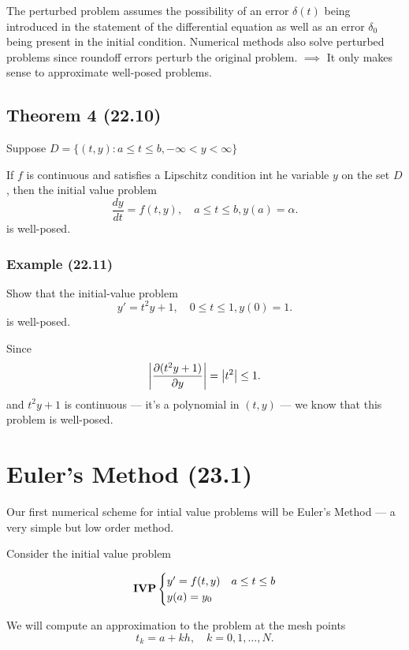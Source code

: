 The perturbed problem assumes the possibility of an error $\delta(t)$ being
introduced in the statement of the differential equation as well as an error
$\delta_0$ being present in the initial condition. Numerical methods also solve
perturbed problems since roundoff errors perturb the original problem.
$\implies$ It only makes sense to approximate well-posed problems.

\subsection{Theorem 4 (22.10)}
\thm Suppose $D=\{(t,y): a\leq t \leq b, -\infty < y < \infty\}$ 

If $f$ is continuous and satisfies a Lipschitz condition int he variable $y$ on
the set $D$, then the initial value problem
\[
\frac{dy}{dt}=f(t,y), \quad a \leq t \leq b, y(a) = \alpha
.\]
is well-posed.

\subsubsection{Example (22.11)}
\Ex Show that the initial-value problem
\[
y' = t^2y+1 , \quad 0 \leq t \leq 1, y(0) = 1
.\]
is well-posed.

\soln Since
\[
  \abs{\frac{\partial(t^2y+1)}{\partial y}} = \abs{t^2} \leq 1
.\]
and $t^2y+1$ is continuous --- it's a polynomial in $(t,y)$ --- we know that
this problem is well-posed.

\section{Euler's Method (23.1)}

Our first numerical scheme for intial value problems will be Euler's Method ---
a very simple but low order method.

Consider the initial value problem

\[
  \text{\textbf{IVP}}\begin{cases}
y' = f(t,y) & a \leq t \leq b\\
y(a) = y_0 & 
\end{cases}
\]

We will compute an approximation to the problem at the mesh points
\[
t_k = a + kh, \quad k = 0, 1, \ldots, N
.\]

